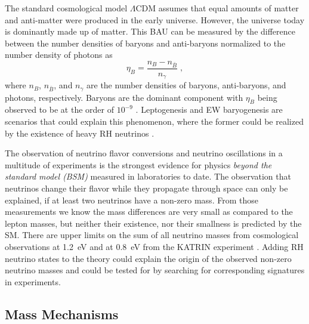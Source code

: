 
The standard cosmological model $\Lambda$CDM  assumes that equal amounts of matter and anti-matter were produced in the early universe. However, the universe today is dominantly made up of matter. This BAU can be measured by the difference between the number densities of baryons and anti-baryons normalized to the number density of photons as
\begin{equation}
    \eta_B = \frac{n_B - n_{\bar{B}}}{n_\gamma}
    \;,
\end{equation}
where $n_B$, $n_{\bar{B}}$, and $n_\gamma$ are the number densities of baryons, anti-baryons, and photons, respectively. Baryons are the dominant component with  $\eta_B$ being observed to be at the order of $10^{-9}$ . Leptogenesis and EW baryogenesis are scenarios that could explain this phenomenon, where the former could be realized by the existence of heavy RH neutrinos .

The observation of neutrino flavor conversions and neutrino oscillations in a multitude of experiments  is the strongest evidence for physics \textit{beyond the standard model (BSM)} measured in laboratories to date. The observation that neutrinos change their flavor while they propagate through space can only be explained, if at least two neutrinos have a non-zero mass. From those measurements we know the mass differences are very small as compared to the lepton masses, but neither their existence, nor their smallness is predicted by the SM. There are upper limits on the sum of all neutrino masses from cosmological observations at \SI{1.2}{\electronvolt}  and at \SI{0.8}{\electronvolt} from the KATRIN experiment . Adding RH neutrino states to the theory could explain the origin of the observed non-zero neutrino masses and could be tested for by searching for corresponding signatures in experiments.


\subsection{Mass Mechanisms}

